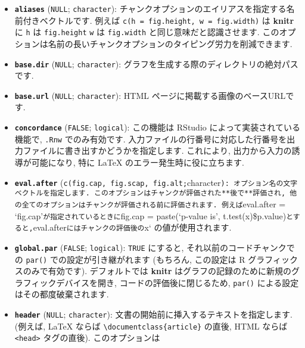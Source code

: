 \documentclass[
  lualatex,ja=standard,jafont=noto-otf]{bxjsreport}
\providecommand{\tightlist}{%
  \setlength{\itemsep}{0pt}\setlength{\parskip}{0pt}}
\begin{document}
\begin{itemize}
\tightlist
\item
  \textbf{\texttt{aliases}} (\texttt{NULL}; \texttt{character}):
  チャンクオプションのエイリアスを指定する名前付きベクトルです. 例えば
  \texttt{c(h\ =\ \textquotesingle{}fig.height\textquotesingle{},\ w\ =\ \textquotesingle{}fig.width\textquotesingle{})}
  は \textbf{knitr} に \texttt{h} は \texttt{fig.height} \texttt{w} は
  \texttt{fig.width} と同じ意味だと認識させます.
  このオプションは名前の長いチャンクオプションのタイピング労力を削減できます.
\item
  \textbf{\texttt{base.dir}} (\texttt{NULL}; \texttt{character}):
  グラフを生成する際のディレクトリの絶対パスです.
\item
  \textbf{\texttt{base.url}} (\texttt{NULL}; \texttt{character}): HTML
  ページに掲載する画像のベースURLです.
\item
  \textbf{\texttt{concordance}} (\texttt{FALSE}; \texttt{logical}):
  この機能は RStudio によって実装されている機能で, \texttt{.Rnw}
  でのみ有効です.
  入力ファイルの行番号に対応した行番号を出力ファイルに書き出すかどうかを指定します.
  これにより, 出力から入力の誘導が可能になり, 特に LaTeX
  のエラー発生時に役に立ちます.
\item
  \textbf{\texttt{eval.after}}
  (\texttt{c(\textquotesingle{}fig.cap\textquotesingle{},\ \textquotesingle{}fig.scap\textquotesingle{},\ \textquotesingle{}fig.alt\textquotesingle{};}character\texttt{):\ オプション名の文字ベクトルを指定します.\ このオプションはチャンクが評価された**後で**評価され,\ 他の全てのオプションはチャンクが評価される前に評価されます.\ 例えば}eval.after
  = `fig.cap'\texttt{が指定されているときに}fig.cap = paste(`p-value
  is',
  t.test(x)\$p.value)\texttt{とすると,}eval.after\texttt{にはチャンクの評価後の}x`
  の値が使用されます.
\item
  \textbf{\texttt{global.par}} (\texttt{FALSE}; \texttt{logical}):
  \texttt{TRUE} にすると, それ以前のコードチャンクでの \texttt{par()}
  での設定が引き継がれます (もちろん, この設定は R
  グラフィックスのみで有効です). デフォルトでは \textbf{knitr}
  はグラフの記録のために新規のグラフィックデバイスを開き,
  コードの評価後に閉じるため, \texttt{par()}
  による設定はその都度破棄されます.
\item
  \textbf{\texttt{header}} (\texttt{NULL}; \texttt{character}):
  文書の開始前に挿入するテキストを指定します. (例えば, LaTeX ならば
  \texttt{\textbackslash{}documentclass\{article\}} の直後, HTML ならば
  \texttt{\textless{}head\textgreater{}} タグの直後). このオプションは

\end{itemize}
\end{document}
